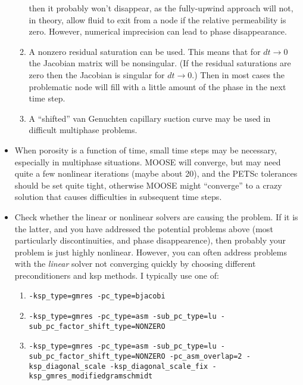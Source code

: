 \documentclass[]{scrreprt}
\begin{document}
\begin{itemize}
\begin{enumerate}
  then it probably won't disappear, as the fully-upwind approach will
  not, in theory, allow fluid to exit from a node if the relative
  permeability is zero.  However, numerical imprecision can lead to
  phase disappearance.
\item A nonzero residual saturation can be used.  This means that for
  $dt\rightarrow 0$ the Jacobian matrix will be nonsingular.  (If the
  residual saturations are zero then the Jacobian is singular for
  $dt\rightarrow 0$.)  Then in most cases the problematic node will
  fill with a little amount of the phase in the next time step.
\item A ``shifted'' van Genuchten capillary suction curve may be used
  in difficult multiphase problems.
\end{enumerate}
\item When porosity is a function of time, small time steps may be
  necessary, especially in multiphase situations.  MOOSE will
  converge, but may need quite a few nonlinear iterations (maybe about
  20), and the PETSc tolerances should be set quite tight, otherwise
  MOOSE might ``converge'' to a crazy solution that causes
  difficulties in subsequent time steps.
\item Check whether the linear or nonlinear solvers are causing the
  problem.  If it is the latter, and you have addressed the potential
  problems above (most particularly discontinuities, and phase
  disappearence), then probably your problem is just highly
  nonlinear.  However, you can often address problems with the
  {\em linear} solver not converging quickly by choosing different
  preconditioners and ksp methods.  I typically use one of:
\begin{enumerate}
\item {\tt -ksp\_type=gmres -pc\_type=bjacobi}
\item {\tt -ksp\_type=gmres -pc\_type=asm -sub\_pc\_type=lu -sub\_pc\_factor\_shift\_type=NONZERO}
\item {\tt -ksp\_type=gmres -pc\_type=asm -sub\_pc\_type=lu -sub\_pc\_factor\_shift\_type=NONZERO -pc\_asm\_overlap=2 -ksp\_diagonal\_scale -ksp\_diagonal\_scale\_fix -ksp\_gmres\_modifiedgramschmidt}
\end{enumerate}
\end{itemize}
\end{document}
